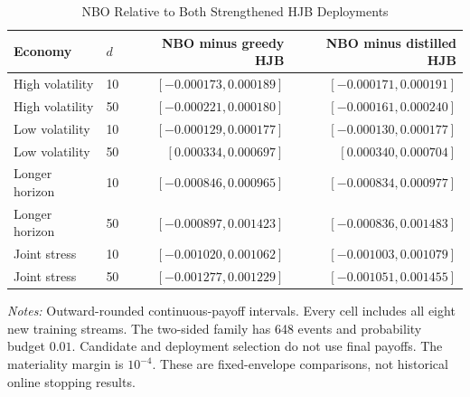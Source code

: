 \begin{table}[!htbp]
\centering\footnotesize
\caption{NBO Relative to Both Strengthened HJB Deployments}\label{tab:r16readinghjb}
\begin{tabular}{llrr}
\toprule
Economy & $d$ & NBO minus greedy HJB & NBO minus distilled HJB \\
\midrule
High volatility & 10 & $[-0.000173,0.000189]$ & $[-0.000171,0.000191]$ \\
High volatility & 50 & $[-0.000221,0.000180]$ & $[-0.000161,0.000240]$ \\
Low volatility & 10 & $[-0.000129,0.000177]$ & $[-0.000130,0.000177]$ \\
Low volatility & 50 & $[0.000334,0.000697]$ & $[0.000340,0.000704]$ \\
Longer horizon & 10 & $[-0.000846,0.000965]$ & $[-0.000834,0.000977]$ \\
Longer horizon & 50 & $[-0.000897,0.001423]$ & $[-0.000836,0.001483]$ \\
Joint stress & 10 & $[-0.001020,0.001062]$ & $[-0.001003,0.001079]$ \\
Joint stress & 50 & $[-0.001277,0.001229]$ & $[-0.001051,0.001455]$ \\
\bottomrule
\end{tabular}
\begin{minipage}{0.97\linewidth}\footnotesize\emph{Notes:} Outward-rounded continuous-payoff intervals. Every cell includes all eight new training streams. The two-sided family has 648 events and probability budget $0.01$. Candidate and deployment selection do not use final payoffs. The materiality margin is $10^{-4}$. These are fixed-envelope comparisons, not historical online stopping results.
\end{minipage}
\end{table}
